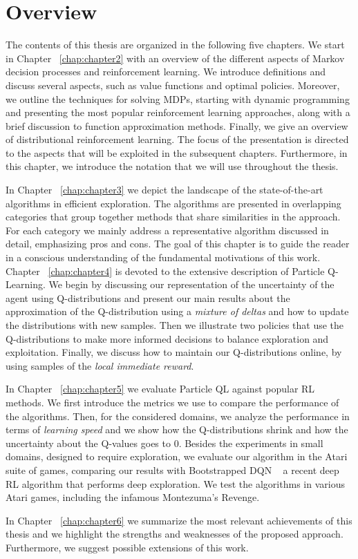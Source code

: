 \section{Overview}
The contents of this thesis are organized in the following five chapters. We start
in Chapter ~\ref{chap:chapter2} with an overview of the different aspects of Markov decision processes and reinforcement learning. We introduce definitions and discuss several aspects, such as value functions and optimal policies. Moreover, we outline the techniques for solving MDPs, starting with dynamic programming and presenting the most popular reinforcement learning approaches, along with  a brief discussion to function approximation methods. Finally, we give an overview of distributional reinforcement learning. The focus of the presentation is directed to the aspects that will be exploited in the subsequent chapters. Furthermore, in this chapter,
we introduce the notation that we will use throughout the thesis.\par
In Chapter ~\ref{chap:chapter3} we depict the landscape of the state-of-the-art algorithms in efficient exploration. The algorithms are presented in overlapping categories that group together methods that share similarities in the approach. For each category we mainly address a representative algorithm discussed in detail, emphasizing pros and cons. The goal of this chapter is to guide the reader in a conscious understanding of the fundamental motivations of this work.
Chapter ~\ref{chap:chapter4} is devoted to the extensive description of Particle Q-Learning. We begin by discussing our representation of the uncertainty of the agent using Q-distributions and present our main results about the approximation of the Q-distribution using a \emph{mixture of deltas} and how to update the distributions with new samples. Then we illustrate two policies that use the Q-distributions to make more informed decisions to balance exploration and exploitation. Finally, we discuss how to maintain our Q-distributions online, by using samples of the \emph{local immediate reward}.\par
In Chapter ~\ref{chap:chapter5} we evaluate Particle QL against popular RL methods. We first introduce the metrics we use to compare the performance of the algorithms. Then, for the considered domains, we analyze the performance in terms of \emph{learning speed} and we show how the Q-distributions shrink and how the uncertainty about the Q-values goes to 0. Besides the experiments in small domains, designed to require exploration, we evaluate our algorithm in the Atari suite of games, comparing our results with Bootstrapped DQN ~\cite{DBLP:journals/corr/OsbandBPR16} a recent deep RL algorithm that performs deep exploration. We test the algorithms in various Atari games, including the infamous Montezuma's Revenge.\par
In Chapter ~\ref{chap:chapter6} we summarize the most relevant achievements of this thesis and we highlight the strengths and weaknesses of the proposed approach. Furthermore, we suggest possible extensions of this work.
